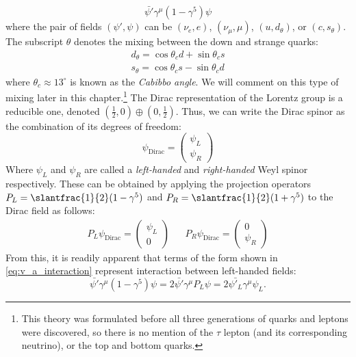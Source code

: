 \begin{equation}\label{eq:v_a_interaction}
\bar{\psi'}\gamma^\mu(1-\gamma^5)\psi
\end{equation}
where the pair of fields $(\psi', \psi)$ can be $(\nu_e, e)$, $(\nu_\mu,\mu)$, $(u, d_\theta)$, or $(c, s_\theta)$. The subscript $\theta$ denotes the mixing between the down and strange quarks: 
  \begin{equation}
    \begin{split}
    d_\theta = \cos\theta_c d + \sin\theta_c s\\
    s_\theta = \cos\theta_c s - \sin\theta_c d
  \end{split}
  \end{equation}
  where $\theta_c \approx 13^\circ$ is known as the \emph{Cabibbo angle}. We will comment on this type of mixing later in this chapter.\footnote{This theory was formulated before all three generations of quarks and leptons were discovered, so there is no mention of the $\tau$ lepton (and its corresponding neutrino), or the top and bottom quarks.}
  The Dirac representation of the Lorentz group is a reducible one, denoted $\left(\frac{1}{2},0\right)\oplus\left(0,\frac{1}{2}\right)$. Thus, we can write the Dirac spinor as the combination of its degrees of freedom:
\begin{equation}
  \psi_\text{Dirac} = \begin{pmatrix}\psi_L\\\psi_R\end{pmatrix} 
\end{equation}
Where $\psi_L$ and $\psi_R$ are called a \emph{left-handed} and \emph{right-handed} Weyl spinor respectively. These can be obtained by applying the projection operators $P_L = \slantfrac{1}{2}(1-\gamma^5)$ and $P_R = \slantfrac{1}{2}(1+\gamma^5)$  
to the Dirac field as follows:
\begin{align}
  P_L\psi_\text{Dirac} =
 \begin{pmatrix}
    \psi_L\\0
  \end{pmatrix}
  && 
  P_R\psi_\text{Dirac} = 
  \begin{pmatrix}
    0\\\psi_R
  \end{pmatrix}
\end{align}
From this, it is readily apparent that terms of the form shown in \autoref{eq:v_a_interaction} represent interaction between left-handed fields:
\begin{equation}
\bar{\psi'}\gamma^\mu(1-\gamma^5)\psi = 2\bar{\psi'}\gamma^\mu P_L\psi = 2\bar{\psi'_L}\gamma^\mu\psi _L.
\end{equation}
